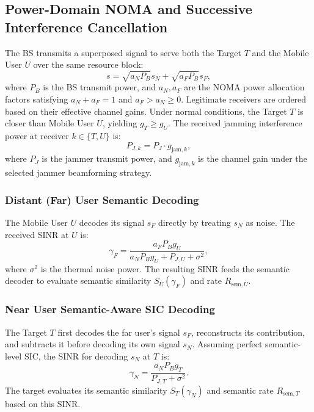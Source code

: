\documentclass[journal,onecolumn]{IEEEtran}
\begin{document}
\subsection{Power-Domain NOMA and Successive Interference Cancellation}
The BS transmits a superposed signal to serve both the Target $T$ and the Mobile User $U$ over the same resource block:
\begin{equation}
    s = \sqrt{a_N P_B} s_N + \sqrt{a_F P_B} s_F,
\end{equation}
where $P_B$ is the BS transmit power, and $a_N, a_F$ are the NOMA power allocation factors satisfying $a_N + a_F = 1$ and $a_F > a_N \ge 0$. Legitimate receivers are ordered based on their effective channel gains. Under normal conditions, the Target $T$ is closer than Mobile User $U$, yielding $g_T \ge g_U$. The received jamming interference power at receiver $k \in \{T, U\}$ is:
\begin{equation}
    P_{J, k} = P_J \cdot g_{\text{jam}, k},
\end{equation}
where $P_J$ is the jammer transmit power, and $g_{\text{jam}, k}$ is the channel gain under the selected jammer beamforming strategy.

\subsubsection{Distant (Far) User Semantic Decoding}
The Mobile User $U$ decodes its signal $s_F$ directly by treating $s_N$ as noise. The received SINR at $U$ is:
\begin{equation}
    \gamma_F = \frac{a_F P_B g_U}{a_N P_B g_U + P_{J, U} + \sigma^2},
\end{equation}
where $\sigma^2$ is the thermal noise power. The resulting SINR feeds the semantic decoder to evaluate semantic similarity $S_U(\gamma_F)$ and rate $R_{\text{sem}, U}$.

\subsubsection{Near User Semantic-Aware SIC Decoding}
The Target $T$ first decodes the far user's signal $s_F$, reconstructs its contribution, and subtracts it before decoding its own signal $s_N$. Assuming perfect semantic-level SIC, the SINR for decoding $s_N$ at $T$ is:
\begin{equation}
    \gamma_N = \frac{a_N P_B g_T}{P_{J, T} + \sigma^2}.
\end{equation}
The target evaluates its semantic similarity $S_T(\gamma_N)$ and semantic rate $R_{\text{sem}, T}$ based on this SINR.
\end{document}
